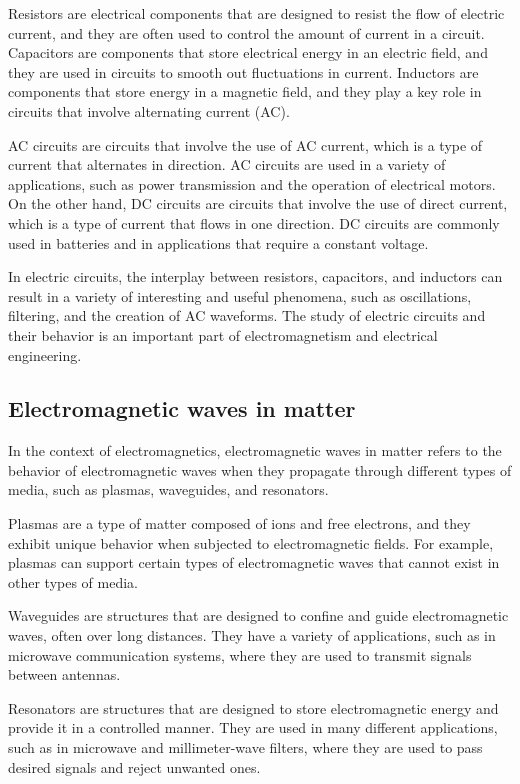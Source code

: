 \documentclass{article}
\begin{document}
Resistors are electrical components that are designed to resist the flow of
electric current, and they are often used to control the amount of current in a
circuit. Capacitors are components that store electrical energy in an electric
field, and they are used in circuits to smooth out fluctuations in current.
Inductors are components that store energy in a magnetic field, and they play a
key role in circuits that involve alternating current (AC).

AC circuits are circuits that involve the use of AC current, which is a type of
current that alternates in direction. AC circuits are used in a variety of
applications, such as power transmission and the operation of electrical
motors. On the other hand, DC circuits are circuits that involve the use of
direct current, which is a type of current that flows in one direction. DC
circuits are commonly used in batteries and in applications that require a
constant voltage.

In electric circuits, the interplay between resistors, capacitors, and
inductors can result in a variety of interesting and useful phenomena, such as
oscillations, filtering, and the creation of AC waveforms. The study of
electric circuits and their behavior is an important part of electromagnetism
and electrical engineering.
\subsection{Electromagnetic waves in matter} %
\label{ssub:Electromagnetic waves in mattersubsection name}
In the context of electromagnetics, electromagnetic waves in matter refers to
the behavior of electromagnetic waves when they propagate through different
types of media, such as plasmas, waveguides, and resonators.

Plasmas are a type of matter composed of ions and free electrons, and they
exhibit unique behavior when subjected to electromagnetic fields. For example,
plasmas can support certain types of electromagnetic waves that cannot exist in
other types of media.

Waveguides are structures that are designed to confine and guide
electromagnetic waves, often over long distances. They have a variety of
applications, such as in microwave communication systems, where they are used
to transmit signals between antennas.

Resonators are structures that are designed to store electromagnetic energy and
provide it in a controlled manner. They are used in many different
applications, such as in microwave and millimeter-wave filters, where they are
used to pass desired signals and reject unwanted ones.
\end{document}
